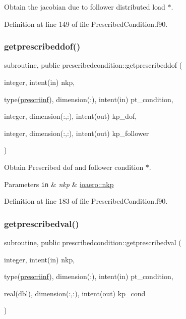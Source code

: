 Obtain the jacobian due to follower distributed load $\ast$. 



Definition at line 149 of file Prescribed\+Condition.\+f90.

\mbox{\label{namespaceprescribedcondition_a88f45dfc44f37db180ed595e112a2a36}} 
\subsubsection{\texorpdfstring{getprescribeddof()}{getprescribeddof()}}
{\footnotesize\ttfamily subroutine, public prescribedcondition\+::getprescribeddof (\begin{DoxyParamCaption}\item[{integer, intent(in)}]{nkp,  }\item[{type(\hyperlink{structprescribedcondition_1_1prescriinf}{prescriinf}), dimension(\+:), intent(in)}]{pt\+\_\+condition,  }\item[{integer, dimension(\+:,\+:), intent(out)}]{kp\+\_\+dof,  }\item[{integer, dimension(\+:,\+:), intent(out)}]{kp\+\_\+follower }\end{DoxyParamCaption})}



Obtain Prescribed dof and follower condition $\ast$. 


\begin{DoxyParams}[1]{Parameters}
\mbox{\tt in}  & {\em nkp} & \hyperlink{namespaceioaero_a24506866304c39bd1fa57ef73b124335}{ioaero\+::nkp} \\
\hline
\end{DoxyParams}


Definition at line 183 of file Prescribed\+Condition.\+f90.

\mbox{\label{namespaceprescribedcondition_aca74e9a71af6abd13879e147076e89ef}} 
\subsubsection{\texorpdfstring{getprescribedval()}{getprescribedval()}}
{\footnotesize\ttfamily subroutine, public prescribedcondition\+::getprescribedval (\begin{DoxyParamCaption}\item[{integer, intent(in)}]{nkp,  }\item[{type(\hyperlink{structprescribedcondition_1_1prescriinf}{prescriinf}), dimension(\+:), intent(in)}]{pt\+\_\+condition,  }\item[{real(dbl), dimension(\+:,\+:), intent(out)}]{kp\+\_\+cond }\end{DoxyParamCaption})}



